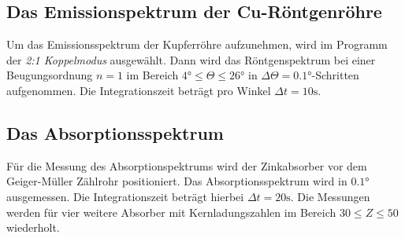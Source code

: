 \subsection{Das Emissionspektrum der Cu-Röntgenröhre}
Um das Emissionsspektrum der Kupferröhre aufzunehmen, wird im Programm der \textit{2:1 Koppelmodus}
ausgewählt. Dann wird das Röntgenspektrum bei einer Beugungsordnung $n=1$ im Bereich
$4 \si{\degree} \leq \Theta \leq 26 \si{\degree}$ in $\Delta \Theta = 0.1 \si{\degree}$-Schritten aufgenommen.
Die Integrationszeit beträgt pro Winkel $\Delta t = 10 \si{\second}$.


\subsection{Das Absorptionsspektrum}
Für die Messung des Absorptionspektrums wird der Zinkabsorber vor dem Geiger-Müller
Zählrohr positioniert. Das Absorptionsspektrum wird in $0.1 \si{\degree}$ ausgemessen.
Die Integrationszeit beträgt hierbei $\Delta t = 20 \si{\second}$.
Die Messungen werden für vier weitere Absorber mit Kernladungszahlen im Bereich
$30 \leq Z \leq 50$ wiederholt.

